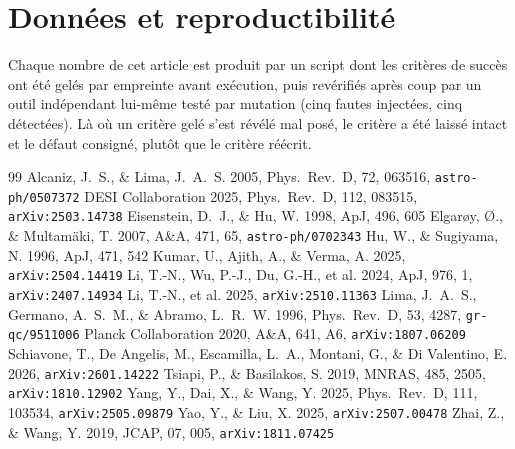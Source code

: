 \documentclass[11pt,a4paper]{article}
\begin{document}
\section*{Données et reproductibilité}
Chaque nombre de cet article est produit par un script dont les critères de succès ont été
gelés par empreinte avant exécution, puis revérifiés après coup par un outil indépendant
lui-même testé par mutation (cinq fautes injectées, cinq détectées). Là où un critère gelé
s'est révélé mal posé, le critère a été laissé intact et le défaut consigné, plutôt que le
critère réécrit.

\begin{thebibliography}{99}
 Alcaniz, J.~S., \& Lima, J.~A.~S. 2005,
  Phys.\ Rev.\ D, 72, 063516, \texttt{astro-ph/0507372}
 DESI Collaboration 2025, Phys.\ Rev.\ D, 112,
  083515, \texttt{arXiv:2503.14738}
 Eisenstein, D.~J., \& Hu, W. 1998, ApJ, 496, 605
 Elgar\o y, \O., \& Multam\"aki, T.
  2007, A\&A, 471, 65, \texttt{astro-ph/0702343}
 Hu, W., \& Sugiyama, N. 1996, ApJ, 471, 542
 Kumar, U., Ajith, A., \& Verma, A. 2025,
  \texttt{arXiv:2504.14419}
 Li, T.-N., Wu, P.-J., Du, G.-H., et al. 2024, ApJ, 976, 1,
  \texttt{arXiv:2407.14934}
 Li, T.-N., et al. 2025, \texttt{arXiv:2510.11363}
 Lima, J.~A.~S., Germano, A.~S.~M., \& Abramo, L.~R.~W.
  1996, Phys.\ Rev.\ D, 53, 4287, \texttt{gr-qc/9511006}
 Planck Collaboration 2020, A\&A, 641, A6,
  \texttt{arXiv:1807.06209}
 Schiavone, T., De Angelis, M., Escamilla,
  L.~A., Montani, G., \& Di Valentino, E. 2026, \texttt{arXiv:2601.14222}
 Tsiapi, P., \& Basilakos, S. 2019, MNRAS,
  485, 2505, \texttt{arXiv:1810.12902}
 Yang, Y., Dai, X., \& Wang, Y. 2025, Phys.\ Rev.\ D, 111, 103534,
  \texttt{arXiv:2505.09879}
 Yao, Y., \& Liu, X. 2025, \texttt{arXiv:2507.00478}
 Zhai, Z., \& Wang, Y. 2019, JCAP, 07, 005,
  \texttt{arXiv:1811.07425}
\end{thebibliography}
\end{document}
